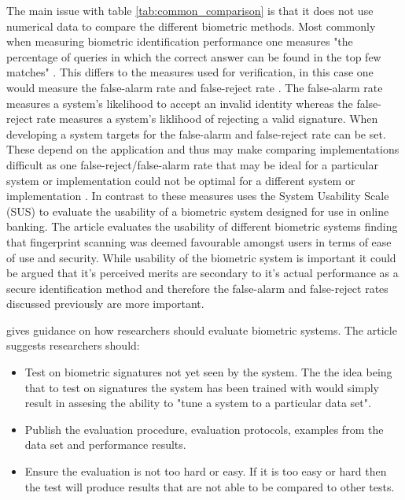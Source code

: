\documentclass[12pt]{article}
\begin{document}
	The main issue with table \ref{tab:common_comparison} is that it does not use numerical data to compare the different biometric methods. Most commonly when measuring biometric identification performance one measures "the percentage of queries in which the correct answer can be found in the top few matches" \citep{phillips_evaluating_biometric_systems2000}. This differs to the measures used for verification, in this case one would measure the false-alarm rate and false-reject rate \citep{phillips_evaluating_biometric_systems2000}. The false-alarm rate measures a system's likelihood to accept an invalid identity whereas the false-reject rate measures a system's liklihood of rejecting a valid signature. When developing a system targets for the false-alarm and false-reject rate can be set. These depend on the application and thus may make comparing implementations difficult as one false-reject/false-alarm rate that may be ideal for a particular system or implementation could not be optimal for a different system or implementation \citep{phillips_evaluating_biometric_systems2000}. In contrast to these measures \cite{TASSABEHJ_Evaluating_biometrics_for_online_banking2012} uses the System Usability Scale (SUS) \citep{brooke1996sus} to evaluate the usability of a biometric system designed for use in online banking. The article evaluates the usability of different biometric systems finding that fingerprint scanning was deemed favourable amongst users in terms of ease of use and security. While usability of the biometric system is important it could be argued that it's perceived merits are secondary to it's actual performance as a secure identification method and therefore the false-alarm and false-reject rates discussed previously are more important.
	
	\cite{phillips_evaluating_biometric_systems2000} gives guidance on how researchers should evaluate biometric systems. The article suggests researchers should:
	\begin{itemize}
	    \item Test on biometric signatures not yet seen by the system. The the idea being that to test on signatures the system has been trained with would simply result in assesing the ability to "tune a system to a particular data set".
	    \item Publish the evaluation procedure, evaluation protocols, examples from the data set and performance results.
	    \item Ensure the evaluation is not too hard or easy. If it is too easy or hard then the test will produce results that are not able to be compared to other tests.
	\end{itemize}
	
\end{document}
